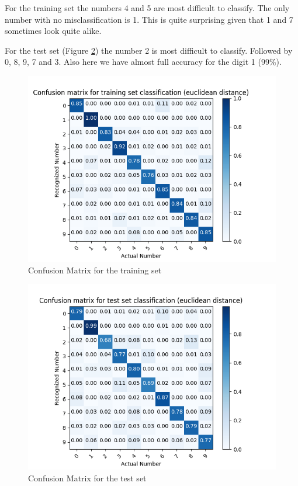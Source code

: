 \documentclass{article}
\begin{document}
For the training set the numbers 4 and 5 are most difficult to classify. The only number with no misclassification is 1. This is quite surprising given that 1 and 7 sometimes look quite alike.

For the test set (Figure \ref{fig:cftest}) the number 2 is most difficult to classify. Followed by 0, 8, 9, 7 and 3. Also here we have almost full accuracy for the digit 1 (99\%).




\begin{figure}[H]
\centering
\includegraphics[width=0.9\linewidth]{img/2/Training-Set-CM-euclidean.png}
\caption{Confusion Matrix for the training set}
\label{fig:cftrain}
\end{figure}
\begin{figure}[H]
\centering
\includegraphics[width=0.9\linewidth]{img/2/Test-Set-CM-euclidean.png}
\caption{Confusion Matrix for the test set}
\label{fig:cftest}
\end{figure}
\end{document}
